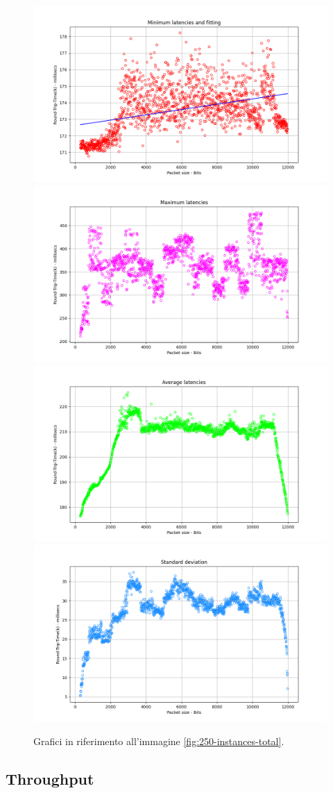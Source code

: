\begin{figure}[h]
    \centering
    \includegraphics[width = .49\textwidth]{hw-2/report/imgs/250-instances/la-min-latencies.png}
    \includegraphics[width = .49\textwidth]{hw-2/report/imgs/250-instances/la-max-latencies.png}
    \includegraphics[width = .49\textwidth]{hw-2/report/imgs/250-instances/la-avg-latencies.png}
    \includegraphics[width = .49\textwidth]{hw-2/report/imgs/250-instances/la-standard-deviation.png}
    \caption{Grafici in riferimento all'immagine \ref{fig:250-instances-total}.}
    \label{fig:250-instances-stats}
\end{figure}

\FloatBarrier\noindent {}


\vspace{15px}\subsection{Throughput} \label{throughput}

